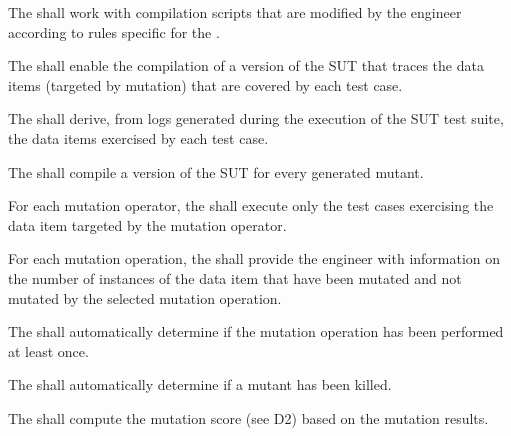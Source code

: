 

\RQ{} The \FAQAS shall work with compilation scripts that are modified by the engineer according to rules specific for the \FAQAS.

\RQ{} The \FAQAS shall enable the compilation of a version of the SUT that traces the data items (targeted by mutation) that are covered by each test case.

\RQ{} The \FAQAS shall derive, from logs generated during the execution of the SUT test suite, the data items exercised by each test case.


\RQ{} The \FAQAS shall compile a version of the SUT for every generated mutant.

\RQ{} For each mutation operator, the \FAQAS shall execute only the test cases exercising the data item targeted by the mutation operator.



\RQ{} For each mutation operation, the \FAQAS shall provide the engineer with information on the number of instances of the data item that have been mutated and not mutated by the selected mutation operation.

\RQ{} The \FAQAS shall automatically determine if the mutation operation has been performed at least once.

\RQ{} The \FAQAS shall automatically determine if a mutant has been killed.



\RQ{} The \FAQAS shall compute the mutation score (see D2) based on the mutation results.

